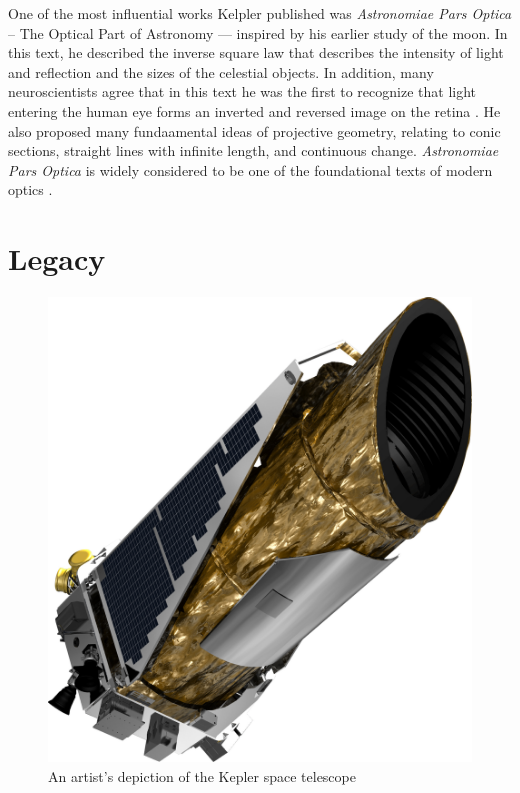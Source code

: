 \documentclass[11pt]{article}
\begin{document}
One of the most influential works
Kelpler published was \textit{Astronomiae Pars Optica}
-- The Optical Part of Astronomy ---
inspired by his earlier study of the moon.
In this text,
he described the inverse square law
that describes the intensity of light and reflection
and the sizes of the celestial objects.
In addition,
many neuroscientists agree that
in this text
he was the first to recognize
that light entering the human eye 
forms an inverted and reversed image on the retina \cite{finger}.
He also proposed many
fundaamental ideas of projective geometry,
relating to conic sections,
straight lines with infinite length,
and continuous change.
\textit{Astronomiae Pars Optica} is widely considered
to be one of the foundational texts of modern optics \cite{caspar}.




\section{Legacy}

\begin{figure}
\centering
	\includegraphics[scale=0.7]{kepler_telescope.png}
	\caption{An artist's depiction of the Kepler space telescope \cite{telpic}}
\label{kepler_telescope}
\end{figure}
\end{document}
